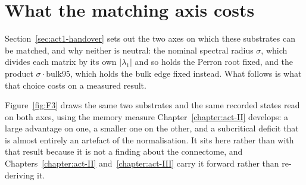 \section{What the matching axis costs}
\label{sec:methods-matching}
\bigskip

Section~\ref{sec:act1-handover} sets out the two axes on which these substrates
can be matched, and why neither is neutral: the nominal spectral radius
$\sigma$, which divides each matrix by its own $|\lambda_1|$ and so holds the
Perron root fixed, and the product $\sigma \cdot \mathrm{bulk95}$, which holds
the bulk edge fixed instead. What follows is what that choice costs on a
measured result.

Figure~\ref{fig:F3} draws the same two substrates and the same recorded states
read on both axes, using the memory measure Chapter~\ref{chapter:act-II}
develops: a large advantage on one, a smaller one on the other, and a
subcritical deficit that is almost entirely an artefact of the normalisation. It
sits here rather than with that result because it is not a finding about the
connectome, and Chapters~\ref{chapter:act-II} and~\ref{chapter:act-III} carry it
forward rather than re-deriving it.

